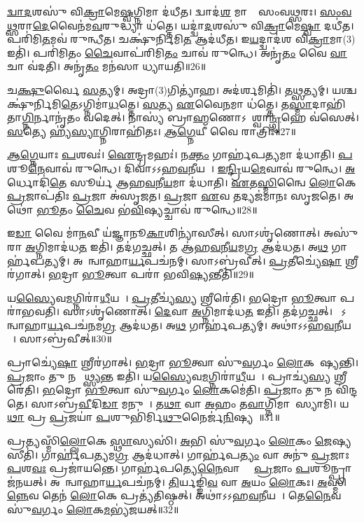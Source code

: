 \ul{𑌦𑍍𑌵𑌾}\ul{𑌦}𑌶𑌸𑍁॑ 𑌵𑌿\ul{𑌕𑍍𑌰𑌾}𑌮𑍇\ul{𑌷𑍍𑌵}𑌗𑍍𑌨𑌿𑌮𑌾 𑌦॑𑌧𑍀𑌤।
𑌦𑍍𑌵𑌾𑌦॑\ul{𑌶} 𑌮𑌾𑌸𑌾𑌃᳚ 𑌸𑌂𑌵\ul{𑌥𑍍𑌸}𑌰𑌃।
\ul{𑌸𑌂}\ul{𑌵}\ul{𑌥𑍍𑌸}𑌰𑌾\ul{𑌦𑍇}𑌵𑍈𑌨॑𑌮\ul{𑌵}𑌰𑍁𑌦𑍍𑌧𑍍𑌯𑌾 𑌧॑𑌤𑍍𑌤𑍇।
𑌯𑌦𑍍𑌦𑍍𑌵𑌾॑\ul{𑌦}𑌶𑌸𑍁॑ 𑌵𑌿\ul{𑌕𑍍𑌰𑌾}𑌮𑍇\ul{𑌷𑍍𑌵𑌾} 𑌦𑌧𑍀॑𑌤।
𑌪𑌰𑌿॑𑌮𑌿\ul{𑌤}𑌮𑌵॑ 𑌰𑍁𑌨𑍍𑌧𑍀𑌤।
𑌚𑌕𑍍𑌷𑍁॑𑌰𑍍𑌨𑌿𑌮𑌿\ul{𑌤} 𑌆𑌦॑𑌧𑍀𑌤।
𑌇\ul{𑌯}𑌦𑍍𑌦𑍍𑌵𑌾𑌦॑𑌶 𑌵𑌿\ul{𑌕𑍍𑌰𑌾}𑌮𑌾(3) 𑌇𑌤𑌿॑।
𑌪𑌰𑌿॑𑌮𑌿𑌤𑌂 \ul{𑌚𑍈}𑌵𑌾𑌪॑𑌰𑌿𑌮𑌿\ul{𑌤𑌂} 𑌚𑌾𑌵॑ 𑌰𑍁𑌨𑍍𑌧𑍇।
𑌅𑌨𑍃॑\ul{𑌤𑌂} 𑌵𑍈 \ul{𑌵𑌾}𑌚𑌾 𑌵॑𑌦𑌤𑌿।
𑌅𑌨𑍃॑\ul{𑌤𑌂} 𑌮𑌨॑𑌸𑌾 𑌧𑍍𑌯𑌾𑌯𑌤𑌿॥26॥

𑌚\ul{𑌕𑍍𑌷𑍁}𑌰𑍍𑌵𑍈 \ul{𑌸}𑌤𑍍𑌯𑌮𑍍।
𑌅𑌦𑍍𑌰𑌾(3)𑌗𑌿𑌤𑍍𑌯𑌾॑𑌹।
𑌅𑌦॑𑌰𑍍\mbox{}\ul{𑌶}𑌮𑌿𑌤𑌿॑।
𑌤\ul{𑌥𑍍𑌸}𑌤𑍍𑌯𑌮𑍍।
𑌯𑌶𑍍𑌚𑌕𑍍𑌷𑍁॑𑌰𑍍𑌨𑌿𑌮𑌿\ul{𑌤𑍇}\-𑌽𑌗𑍍𑌨𑌿𑌮𑌾॑\ul{𑌧}𑌤𑍍𑌤𑍇।
\ul{𑌸}𑌤𑍍𑌯 \ul{𑌏}𑌵𑍈\ul{𑌨}𑌮𑌾 𑌧॑𑌤𑍍𑌤𑍇।
𑌤\ul{𑌸𑍍𑌮𑌾}𑌦𑌾𑌹𑌿॑𑌤𑌾\ul{𑌗𑍍𑌨𑌿}𑌰𑍍𑌨𑌾𑌨𑍃॑𑌤𑌂 𑌵𑌦𑍇𑌤𑍍।
𑌨𑌾𑌸𑍍𑌯॑ 𑌬𑍍𑌰𑌾\ul{𑌹𑍍𑌮}𑌣𑍋\-𑌽𑌨𑌾᳚𑌶𑍍𑌵𑌾\ul{𑌨𑍍𑌗𑍃}𑌹𑍇 𑌵॑𑌸𑍇𑌤𑍍।
\ul{𑌸}𑌤𑍍𑌯𑍇 𑌹𑍍𑌯॑\ul{𑌸𑍍𑌯𑌾}𑌗𑍍𑌨𑌿𑌰𑌾𑌹𑌿॑𑌤𑌃।
\ul{𑌆}\ul{𑌗𑍍𑌨𑍇}𑌯𑍀 𑌵𑍈 𑌰𑌾𑌤𑍍𑌰𑌿𑌃॑॥27॥

\ul{𑌆}\ul{𑌗𑍍𑌨𑍇}𑌯𑌾𑌃 \ul{𑌪}𑌶𑌵𑌃॑।
\ul{𑌐}𑌨𑍍𑌦𑍍𑌰𑌮𑌹𑌃॑।
𑌨\ul{𑌕𑍍𑌤𑌂} 𑌗𑌾𑌰𑍍\mbox{}𑌹॑𑌪\ul{𑌤𑍍𑌯}𑌮𑌾 𑌦॑𑌧𑌾𑌤𑌿।
\ul{𑌪}𑌶𑍂\ul{𑌨𑍇}𑌵𑌾𑌵॑ 𑌰𑍁𑌨𑍍𑌧𑍇।
𑌦𑌿𑌵𑌾॑𑌽𑌽𑌹\ul{𑌵}𑌨𑍀𑌯𑌮𑍍᳚।
\ul{𑌇}\ul{𑌨𑍍𑌦𑍍𑌰𑌿}𑌯\ul{𑌮𑍇}𑌵𑌾𑌵॑ 𑌰𑍁𑌨𑍍𑌧𑍇।
\ul{𑌅}𑌰𑍍𑌧𑍋𑌦𑌿॑\ul{𑌤𑍇} 𑌸𑍂𑌰𑍍𑌯॑ 𑌆𑌹\ul{𑌵}𑌨𑍀\ul{𑌯}𑌮𑌾 𑌦॑𑌧𑌾𑌤𑌿।
\ul{𑌏}𑌤\ul{𑌸𑍍𑌮𑌿}𑌨𑍍𑌵𑍈 \ul{𑌲𑍋}𑌕𑍇 \ul{𑌪𑍍𑌰}𑌜𑌾𑌪॑𑌤𑌿𑌃 \ul{𑌪𑍍𑌰}𑌜𑌾 𑌅॑𑌸𑍃𑌜𑌤।
\ul{𑌪𑍍𑌰}𑌜𑌾 \ul{𑌏}𑌵 𑌤𑌦𑍍𑌯𑌜॑𑌮𑌾𑌨𑌃 𑌸𑍃𑌜𑌤𑍇।
𑌅𑌥𑍋॑ \ul{𑌭𑍂}𑌤𑌂 \ul{𑌚𑍈}𑌵 𑌭॑\ul{𑌵𑌿}𑌷𑍍𑌯𑌚𑍍𑌚𑌾𑌵॑ 𑌰𑍁𑌨𑍍𑌧𑍇॥28॥

𑌇\ul{𑌡𑌾} 𑌵𑍈 𑌮𑌾॑\ul{𑌨}𑌵𑍀 𑌯॑𑌜𑍍𑌞𑌾𑌨𑍂\ul{𑌕𑌾}𑌶𑌿𑌨𑍍𑌯𑌾॑𑌸𑍀𑌤𑍍।
𑌸𑌾𑌽𑌶𑍃॑𑌣𑍋𑌤𑍍।
𑌅𑌸𑍁॑𑌰𑌾 \ul{𑌅}𑌗𑍍𑌨𑌿𑌮𑌾𑌦॑𑌧\ul{𑌤} 𑌇𑌤𑌿॑।
𑌤𑌦॑𑌗𑌚𑍍𑌛𑌤𑍍।
𑌤 𑌆॑𑌹\ul{𑌵}𑌨𑍀\ul{𑌯}𑌮\ul{𑌗𑍍𑌰} 𑌆𑌦॑𑌧𑌤।
𑌅\ul{𑌥} 𑌗𑌾𑌰𑍍\mbox{}𑌹॑𑌪𑌤𑍍𑌯𑌮𑍍।
𑌅𑌥𑌾᳚𑌨𑍍𑌵𑌾𑌹𑌾\ul{𑌰𑍍𑌯}𑌪𑌚॑𑌨𑌮𑍍।
𑌸𑌾𑌽𑌬𑍍𑌰॑𑌵𑍀𑌤𑍍।
\ul{𑌪𑍍𑌰}𑌤𑍀𑌚𑍍𑌯𑍇॑\ul{𑌷𑌾}\ul{} 𑌶𑍍𑌰𑍀𑌰॑𑌗𑌾𑌤𑍍।
\ul{𑌭}𑌦𑍍𑌰𑌾 \ul{𑌭𑍂}𑌤𑍍𑌵𑌾 𑌪𑌰𑌾॑ 𑌭𑌵𑌿\ul{𑌷𑍍𑌯}𑌨𑍍𑌤𑍀𑌤𑌿॑॥29॥

𑌯\ul{𑌸𑍍𑌯𑍈}𑌵\ul{𑌮}𑌗𑍍𑌨𑌿𑌰𑌾॑\ul{𑌧𑍀}𑌯𑌤𑍇᳚।
\ul{𑌪𑍍𑌰}𑌤𑍀𑌚𑍍𑌯॑\ul{𑌸𑍍𑌯} 𑌶𑍍𑌰𑍀𑌰𑍇॑𑌤𑌿।
\ul{𑌭}𑌦𑍍𑌰𑍋 \ul{𑌭𑍂}𑌤𑍍𑌵𑌾 𑌪𑌰𑌾॑𑌭𑌵𑌤𑌿।
𑌸𑌾𑌽𑌶𑍃॑𑌣𑍋𑌤𑍍।
\ul{𑌦𑍇}𑌵𑌾 \ul{𑌅}𑌗𑍍𑌨𑌿𑌮𑌾𑌦॑𑌧\ul{𑌤} 𑌇𑌤𑌿॑।
𑌤𑌦॑𑌗𑌚𑍍𑌛𑌤𑍍।
𑌤𑍇᳚𑌽𑌨𑍍𑌵𑌾𑌹𑌾\ul{𑌰𑍍𑌯}𑌪𑌚॑\ul{𑌨}𑌮\ul{𑌗𑍍𑌰} 𑌆𑌦॑𑌧𑌤।
𑌅\ul{𑌥} 𑌗𑌾𑌰𑍍\mbox{}𑌹॑𑌪𑌤𑍍𑌯𑌮𑍍।
𑌅𑌥𑌾॑𑌽𑌽𑌹\ul{𑌵}𑌨𑍀𑌯𑌮𑍍᳚।
𑌸𑌾𑌽𑌬𑍍𑌰॑𑌵𑍀𑌤𑍍॥30॥

𑌪𑍍𑌰𑌾𑌚𑍍𑌯𑍇॑\ul{𑌷𑌾}\ul{} 𑌶𑍍𑌰𑍀𑌰॑𑌗𑌾𑌤𑍍।
\ul{𑌭}𑌦𑍍𑌰𑌾 \ul{𑌭𑍂}𑌤𑍍𑌵𑌾 𑌸𑍁॑\ul{𑌵}𑌰𑍍𑌗𑌂 \ul{𑌲𑍋}𑌕𑌮𑍇᳚𑌷𑍍𑌯𑌨𑍍𑌤𑌿।
\ul{𑌪𑍍𑌰}𑌜𑌾𑌂 𑌤𑍁 𑌨 𑌵𑍇᳚𑌥𑍍𑌸𑍍𑌯\ul{𑌨𑍍𑌤} 𑌇𑌤𑌿॑।
𑌯\ul{𑌸𑍍𑌯𑍈}𑌵\ul{𑌮}𑌗𑍍𑌨𑌿𑌰𑌾॑\ul{𑌧𑍀}𑌯𑌤𑍇᳚।
𑌪𑍍𑌰𑌾𑌚𑍍𑌯॑\ul{𑌸𑍍𑌯} 𑌶𑍍𑌰𑍀𑌰𑍇॑𑌤𑌿।
\ul{𑌭}𑌦𑍍𑌰𑍋 \ul{𑌭𑍂}𑌤𑍍𑌵𑌾 𑌸𑍁॑\ul{𑌵}𑌰𑍍𑌗𑌂 \ul{𑌲𑍋}𑌕𑌮𑍇॑𑌤𑌿।
\ul{𑌪𑍍𑌰}𑌜𑌾𑌂 𑌤𑍁 𑌨 𑌵𑌿॑𑌨𑍍𑌦𑌤𑍇।
𑌸𑌾𑌽𑌬𑍍𑌰॑\ul{𑌵𑍀}𑌦𑌿\ul{𑌡𑌾} 𑌮𑌨𑍁𑌮𑍍᳚।
𑌤\ul{𑌥𑌾} 𑌵𑌾 \ul{𑌅}𑌹𑌂 𑌤\ul{𑌵𑌾}𑌗𑍍𑌨𑌿𑌮𑌾𑌧𑌾᳚𑌸𑍍𑌯𑌾𑌮𑌿।
𑌯\ul{𑌥𑌾} 𑌪𑍍𑌰 \ul{𑌪𑍍𑌰}𑌜𑌯𑌾॑ \ul{𑌪}𑌶𑍁𑌭𑌿॑𑌰𑍍𑌮𑌿\ul{𑌥𑍁}𑌨𑍈𑌰𑍍𑌜॑\ul{𑌨𑌿}𑌷𑍍𑌯𑌸𑍇᳚॥31॥

𑌪𑍍𑌰\ul{𑌤𑍍𑌯}𑌸𑍍𑌮𑌿𑌁\ul{𑌲𑍍𑌲𑍋}𑌕𑍇 \ul{𑌸𑍍𑌥𑌾}𑌸𑍍𑌯𑌸𑌿॑।
\ul{𑌅}𑌭𑌿 𑌸𑍁॑\ul{𑌵}𑌰𑍍𑌗𑌂 \ul{𑌲𑍋}𑌕𑌂 \ul{𑌜𑍇}𑌷𑍍𑌯𑌸𑍀𑌤𑌿॑।
𑌗𑌾𑌰𑍍\mbox{}𑌹॑𑌪\ul{𑌤𑍍𑌯}𑌮\ul{𑌗𑍍𑌰} 𑌆𑌦॑𑌧𑌾𑌤𑍍।
𑌗𑌾𑌰𑍍\mbox{}𑌹॑𑌪\ul{𑌤𑍍𑌯𑌂} 𑌵𑌾 𑌅𑌨𑍁॑ \ul{𑌪𑍍𑌰}𑌜𑌾𑌃 \ul{𑌪}𑌶\ul{𑌵𑌃} 𑌪𑍍𑌰𑌜𑌾॑𑌯𑌨𑍍𑌤𑍇।
𑌗𑌾𑌰𑍍\mbox{}𑌹॑𑌪𑌤𑍍𑌯𑍇\ul{𑌨𑍈}𑌵𑌾𑌸𑍍𑌮𑍈᳚ \ul{𑌪𑍍𑌰}𑌜𑌾𑌂 \ul{𑌪}𑌶𑍂𑌨𑍍𑌪𑍍𑌰𑌾𑌜॑𑌨𑌯𑌤𑍍।
𑌅𑌥𑌾᳚𑌨𑍍𑌵𑌾𑌹𑌾\ul{𑌰𑍍𑌯}𑌪𑌚॑𑌨𑌮𑍍।
\ul{𑌤𑌿}𑌰𑍍𑌯𑌙𑍍𑌙𑌿॑\ul{𑌵} 𑌵𑌾 \ul{𑌅}𑌯𑌂 \ul{𑌲𑍋}𑌕𑌃।
\ul{𑌅}𑌸𑍍𑌮𑌿\ul{𑌨𑍍𑌨𑍇}𑌵 𑌤𑍇𑌨॑ \ul{𑌲𑍋}𑌕𑍇 𑌪𑍍𑌰𑌤𑍍𑌯॑𑌤𑌿𑌷𑍍𑌠𑌤𑍍।
𑌅𑌥𑌾॑𑌽𑌽𑌹\ul{𑌵}𑌨𑍀𑌯𑌮𑍍᳚।
𑌤𑍇\ul{𑌨𑍈}𑌵 𑌸𑍁॑\ul{𑌵}𑌰𑍍𑌗𑌂 \ul{𑌲𑍋}𑌕\ul{𑌮}𑌭𑍍𑌯॑𑌜𑌯𑌤𑍍॥32॥

